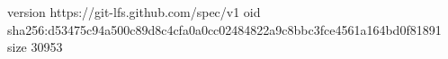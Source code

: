 version https://git-lfs.github.com/spec/v1
oid sha256:d53475c94a500c89d8c4cfa0a0cc02484822a9c8bbc3fce4561a164bd0f81891
size 30953
